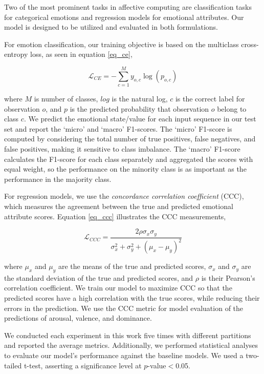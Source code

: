 \documentclass{article}
\begin{document}
Two of the most prominent tasks in affective computing are classification tasks for categorical emotions and regression models for emotional attributes. Our model is designed to be utilized and evaluated in both formulations.

For emotion classification, our training objective is based on the multiclass cross-entropy loss, as seen in equation \ref{eq_ce},

 \begin{equation}\label{eq_ce}
    \mathcal{L}_{CE} = -\sum_{c=1}^My_{o,c}\log(p_{o,c})
 \end{equation}

\noindent
where $M$ is number of classes, $log$ is the natural log, $c$ is the correct label for observation $o$, and $p$ is the predicted probability that observation $o$ belong to class $c$. We predict the emotional state/value for each input sequence in our test set and report the `micro' and `macro' F1-scores. The `micro' F1-score is computed by considering the total number of true positives, false negatives, and false positives, making it sensitive to class imbalance. The `macro' F1-score calculates the F1-score for each class separately and aggregated the scores with equal weight, so the performance on the minority class is as important as the performance in the majority class. 

For regression models, we use the \emph{concordance correlation coefficient} (CCC), which measures the agreement between the true and predicted emotional attribute scores. Equation \ref{eq_ccc} illustrates the CCC measurements,

\begin{equation}\label{eq_ccc}
    \mathcal{L}_{CCC} = \frac{2\rho\sigma_x\sigma_y}{\sigma_x^2+\sigma_y^2+(\mu_x-\mu_y)^2}
 \end{equation}

\noindent 
where $\mu_x$ and $\mu_y$ are the means of the true and predicted scores, $\sigma_x$ and $\sigma_y$ are the standard deviation of the true and predicted scores, and $\rho$ is their Pearson's correlation coefficient. We train our model to maximize CCC so that the predicted scores have a high correlation with the true scores, while reducing their errors in the prediction. We use the CCC metric for model evaluation of the predictions of arousal, valence, and dominance.

We conducted each experiment in this work five times with different partitions and reported the average metrics. Additionally, we performed statistical analyses to evaluate our model's performance against the baseline models. We used a two-tailed t-test, asserting a significance level at $p$-value$<$0.05.
\end{document}

